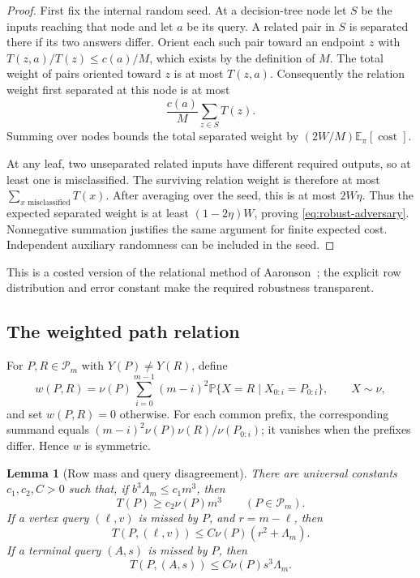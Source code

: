 \documentclass[11pt,a4paper]{article}
\newcommand{\E}{\mathbb E}
\newcommand{\Prb}{\mathbb P}
\newtheorem{lemma}[theorem]{Lemma}
\theoremstyle{definition}
\theoremstyle{remark}
\begin{document}
\begin{proof}
First fix the internal random seed.  At a decision-tree node let $S$ be the
inputs reaching that node and let $a$ be its query.  A related pair in $S$
is separated there if its two answers differ.  Orient each such pair toward
an endpoint $z$ with
$T(z,a)/T(z)\le c(a)/M$, which exists by the definition of $M$.
The total weight of pairs oriented toward $z$ is at most $T(z,a)$.
Consequently the relation weight first separated at this node is at most
\[
 \frac{c(a)}{M}\sum_{z\in S}T(z).
\]
Summing over nodes bounds the total separated weight by
$(2W/M)\E_\pi[\operatorname{cost}]$.

At any leaf, two unseparated related inputs have different required outputs,
so at least one is misclassified.  The surviving relation weight is therefore
at most $\sum_{x\text{ misclassified}}T(x)$.  After averaging over the seed,
this is at most $2W\eta$.  Thus the expected separated weight is at least
$(1-2\eta)W$, proving \eqref{eq:robust-adversary}.  Nonnegative summation
justifies the same argument for finite expected cost.  Independent auxiliary
randomness can be included in the seed.
\end{proof}

This is a costed version of the relational method of
Aaronson~\cite{aaronson2006}; the explicit row distribution and error constant
make the required robustness transparent.

\subsection{The weighted path relation}

For $P,R\in\mathcal P_m$ with $Y(P)\ne Y(R)$, define
\begin{equation}
 w(P,R)=\nu(P)\sum_{i=0}^{m-1}(m-i)^2
 \Prb\{X=R\mid X_{0:i}=P_{0:i}\},\qquad X\sim\nu,
 \label{eq:path-relation}
\end{equation}
and set $w(P,R)=0$ otherwise.  For each common prefix, the corresponding
summand equals $(m-i)^2\nu(P)\nu(R)/\nu(P_{0:i})$; it vanishes when the
prefixes differ.  Hence $w$ is symmetric.

\begin{lemma}[Row mass and query disagreement]
\label{lem:relation-estimates}
There are universal constants $c_1,c_2,C>0$ such that, if
$b^3\Lambda_m\le c_1m^3$, then
\[
 T(P)\ge c_2\nu(P)m^3\qquad(P\in\mathcal P_m).
\]
If a vertex query $(\ell,v)$ is missed by $P$, and $r=m-\ell$, then
\[
 T(P,(\ell,v))\le C\nu(P)(r^2+\Lambda_m).
\]
If a terminal query $(A,s)$ is missed by $P$, then
\[
 T(P,(A,s))\le C\nu(P)s^3\Lambda_m.
\]
\end{lemma}
\end{document}
